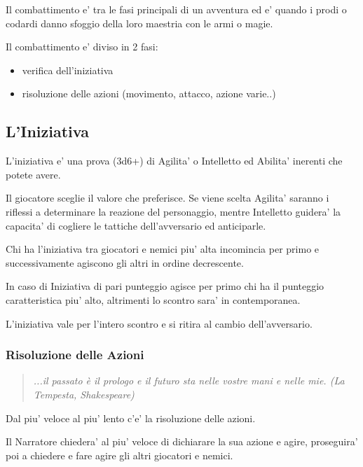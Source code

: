 \documentclass[a4paper,11pt,twoside,openany]{book}
\begin{document}
Il combattimento e' tra le fasi principali di un avventura ed e' quando i prodi o codardi danno sfoggio della loro maestria con le armi o magie.

\bigskip

Il combattimento e' diviso in 2 fasi:
\begin{itemize}
\item verifica dell'iniziativa 
\item risoluzione delle azioni (movimento, attacco, azione varie..) 
\end{itemize}

\subsection{L'Iniziativa}

\label{liniziativa}

L'iniziativa e' una prova (3d6+) di Agilita' o Intelletto ed Abilita' inerenti che potete avere.

Il giocatore sceglie il valore che preferisce. Se viene scelta Agilita' saranno i riflessi a determinare la reazione del personaggio, mentre Intelletto guidera' la capacita' di cogliere le tattiche dell'avversario ed anticiparle.

Chi ha l'iniziativa tra giocatori e nemici piu' alta incomincia per primo e successivamente agiscono gli altri in ordine decrescente. 

In caso di Iniziativa di pari punteggio agisce per primo chi ha il punteggio caratteristica piu' alto, altrimenti lo scontro sara' in contemporanea.

L'iniziativa vale per l'intero scontro e si ritira al cambio dell'avversario.

\subsubsection{Risoluzione delle Azioni}

\begin{quote}\textit{
...il passato è il prologo e il futuro sta nelle vostre mani e nelle mie. (La Tempesta, Shakespeare)
}\end{quote}


\label{risoluzione-delle-azioni}

Dal piu' veloce al piu' lento c'e' la risoluzione delle azioni.

Il Narratore chiedera' al piu' veloce di dichiarare la sua azione e agire, proseguira' poi a chiedere e fare agire gli altri giocatori e nemici.
\end{document}
